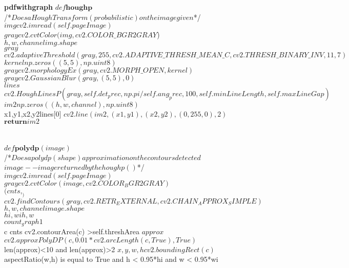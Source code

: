 \documentclass[a4paper,10pt]{scrreprt}
\begin{document}
\begin{pseudocode}{\textbf{pdfwithgraph}}{ }
$def \textbf{houghp} $\\
/\mbox{*}$Does a Hough Transform (probabilistic) on the image given$\mbox{*}/\\
$img$\GETS$cv2.imread(self.pageImage)$\\
$gray$\GETS$cv2.cvtColor(img,cv2.COLOR\_BGR2GRAY$)\\
$h,w,channel$\GETS$img.shape$\\
$gray$\GETS$cv2.adaptiveThreshold(gray,255,cv2.ADAPTIVE\_THRESH\_MEAN\_C,cv2.THRESH\_BINARY\_INV,11,7)$\\
$kernel$\GETS$ np.zeros((5,5),np.uint8)$\\
$gray$\GETS$cv2.morphologyEx(gray, cv2.MORPH\_OPEN, kernel)$\\
$gray$\GETS$cv2.GaussianBlur(gray,(5,5),0)$\\
$lines$\GETS$cv2.HoughLinesP(gray,self.det_prec,np.pi/self.ang_prec,100,self.minLineLength,self.maxLineGap)$\\
$im2$\GETS$np.zeros((h,w,channel),np.uint8)$\\
\FOREACH x1,y1,x2,y2\in lines[0] \DO
\BEGIN 
$cv2.line(im2,(x1,y1),(x2,y2),(0,255,0),2)$\\
$\textbf{return} im2$\\
\END \\
\\
$def \textbf{polydp}(image)$\\
/\mbox{*}$Does a polydp (shape) approximation on the contours detected$\\
$image--image returned by the houghp()$\mbox{*}/\\
$img$\GETS$cv2.imread(self.pageImage)$\\
$gray$\GETS$cv2.cvtColor(image,cv2.COLOR_BGR2GRAY)$\\
$(cnts, _)$\GETS$cv2.findContours(gray, cv2.RETR_EXTERNAL,cv2.CHAIN_APPROX_SIMPLE)$\\
$h,w,channel$\GETS$image.shape$\\
$hi,wi$\GETS$h,w$\\
$count_graph$\GETS$1$\\
\FOREACH c \in cnts\DO
\BEGIN 
\IF cv2.contourArea(c) >self.threshArea \THEN
\BEGIN 
$approx$\GETS$cv2.approxPolyDP(c,0.01*cv2.arcLength(c,True),True)$\\
\IF len(approx)<10 and len(approx)>2 \THEN
\BEGIN
$x,y,w,h$\GETS$cv2.boundingRect(c)$\\
\IF aspectRatio(w,h) is equal to True and h < 0.95*hi and w < 0.95*wi \THEN

\end{pseudocode}
\end{document}
